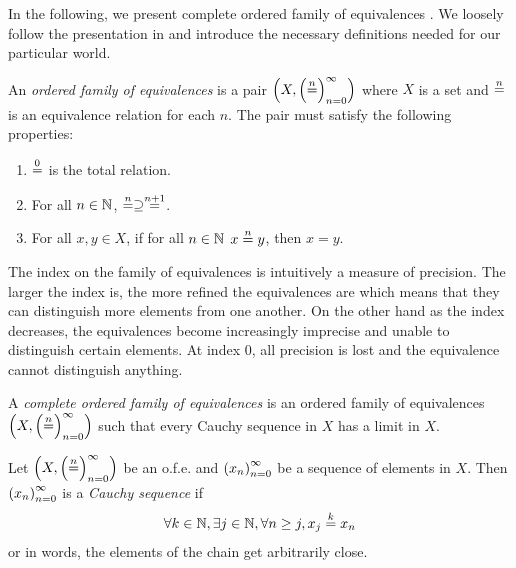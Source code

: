 \begin{jversion}
In the following, we present complete ordered family of equivalences \citep{di_gianantonio_2002}.
We loosely follow the presentation in \citet{birkedal_taste_2014} and introduce the necessary definitions needed for our particular world.
\begin{definition}
An \emph{ordered family of equivalences} is a pair $\cofe{X}$ where $X$ is a set and $\nequal$ is an equivalence relation for each $n$.
The pair must satisfy the following properties:
\begin{enumerate}
\item $\nequal[0]$ is the total relation.
\item For all $n \in \nats$, $\nequal[n] \supseteq \nequal[n+1]$.
\item For all $x,y \in X$,  if for all $n \in \nats$ $x \nequal y$, then $x = y$.
\end{enumerate}
\end{definition}
\noindent The index on the family of equivalences is intuitively a measure of precision.
The larger the index is, the more refined the equivalences are which means that they can distinguish more elements from one another.
On the other hand as the index decreases, the equivalences become increasingly imprecise and unable to distinguish certain elements.
At index 0, all precision is lost and the equivalence cannot distinguish anything.
\begin{definition}
  \label{def:cauchy-sequence}
  A \emph{complete ordered family of equivalences} is an ordered family of equivalences
  $\cofe{X}$ such that every Cauchy sequence in $X$ has a limit
  in $X$.

  Let $\cofe{X}$ be an o.f.e. and $\seq{x}$ be a sequence of
  elements in $X$. Then $\seq{x}$ is a \emph{Cauchy sequence} if
  \begin{align*}
    \forall k \in \nats, \exists j \in \nats, \forall n \geq j, x_j \nequal[k] x_n
  \end{align*}
  or in words, the elements of the chain get arbitrarily close.


\end{definition}
\end{jversion}
